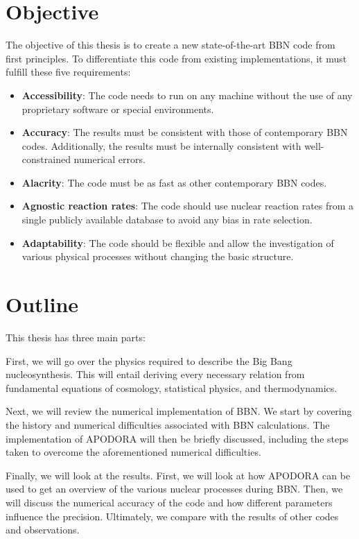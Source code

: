 \section{Objective} 
The objective of this thesis is to create a new state-of-the-art BBN code from first principles. To differentiate this code from existing implementations, it must fulfill these five requirements:

\begin{itemize}
    \item \textbf{Accessibility}: The code needs to run on any machine without the use of any proprietary software or special environments. %
    \item \textbf{Accuracy}: The results must be consistent with those of contemporary BBN codes. Additionally, the results must be internally consistent with well-constrained numerical errors. 
    \item \textbf{Alacrity}: The code must be as fast as other contemporary BBN codes.
    \item \textbf{Agnostic reaction rates}: The code should use nuclear reaction rates from a single publicly available database to avoid any bias in rate selection.
    \item \textbf{Adaptability}: The code should be flexible and allow the investigation of various physical processes without changing the basic structure.
\end{itemize}

\section{Outline}

This thesis has three main parts:

\noindent First, we will go over the physics required to describe the Big Bang nucleosynthesis. This will entail deriving every necessary relation from fundamental equations of cosmology, statistical physics, and thermodynamics. 

\noindent Next, we will review the numerical implementation of BBN. We start by covering the history and numerical difficulties associated with BBN calculations. The implementation of APODORA will then be briefly discussed, including the steps taken to overcome the aforementioned numerical difficulties.


\noindent Finally, we will look at the results. First, we will look at how APODORA can be used to get an overview of the various nuclear processes during BBN. Then, we will discuss the numerical accuracy of the code and how different parameters influence the precision. Ultimately, we compare with the results of other codes and observations.





